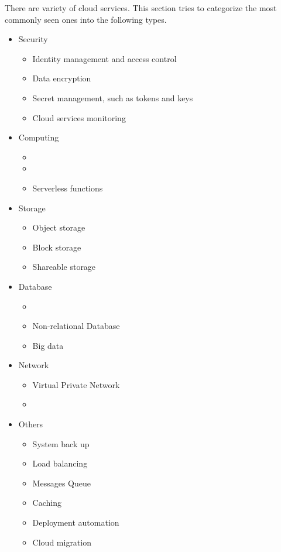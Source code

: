 There are variety of cloud services. This section tries to categorize the most commonly seen ones into the following types.
\begin{itemize}
	\item Security
	\begin{itemize}
		\item Identity management and access control
		\item Data encryption
		\item Secret management, such as tokens and keys
		\item Cloud services monitoring
	\end{itemize}
	\item Computing
	\begin{itemize}
		\item {}
		\item {}
		\item Serverless functions
	\end{itemize}
	\item Storage
	\begin{itemize}
		\item Object storage
		\item Block storage
		\item Shareable storage
	\end{itemize}
	\item Database
	\begin{itemize}
		\item {}
		\item Non-relational Database
		\item Big data
	\end{itemize}
	\item Network
	\begin{itemize}
		\item Virtual Private Network
		\item {}
	\end{itemize}
	\item Others
	\begin{itemize}
		\item System back up
		\item Load balancing
		\item Messages Queue
		\item Caching
		\item Deployment automation
		\item Cloud migration
	\end{itemize}
\end{itemize}


